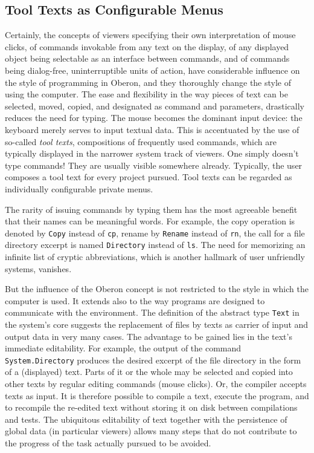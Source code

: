 \subsection{Tool Texts as Configurable Menus}
Certainly, the concepts of viewers specifying their own interpretation of mouse clicks,
of commands invokable from any text on the display, of any displayed object being selectable
as an interface between commands, and of commands being dialog-free, uninterruptible units
of action, have considerable influence on the style of programming in Oberon, and they
thoroughly change the style of using the computer. The ease and flexibility in the way
pieces of text can be selected, moved, copied, and designated as command and parameters,
drastically reduces the need for typing. The mouse becomes the dominant input device: the
keyboard merely serves to input textual data. This is accentuated by the use of so-called
\emph{tool texts}, compositions of frequently used commands, which are typically displayed
in the narrower system track of viewers. One simply doesn't type commands! They are usually
visible somewhere already. Typically, the user composes a tool text for every project pursued.
Tool texts can be regarded as individually configurable private menus.

The rarity of issuing commands by typing them has the most agreeable benefit that their names
can be meaningful words. For example, the copy operation is denoted by \verb|Copy| instead of
\verb|cp|, rename by \verb|Rename| instead of \verb|rn|, the call for a file directory excerpt
is named \verb|Directory| instead of \verb|ls|. The need for memorizing an infinite list of
cryptic abbreviations, which is another hallmark of user unfriendly systems, vanishes.

But the influence of the Oberon concept is not restricted to the style in which the computer
is used. It extends also to the way programs are designed to communicate with the environment.
The definition of the abstract type \verb|Text| in the system's core suggests the replacement
of files by texts as carrier of input and output data in very many cases. The advantage to
be gained lies in the text's immediate editability. For example, the output of the command
\verb|System.Directory| produces the desired excerpt of the file directory in the form of
a (displayed) text. Parts of it or the whole may be selected and copied into other texts
by regular editing commands (mouse clicks). Or, the compiler accepts texts as input. It is
therefore possible to compile a text, execute the program, and to recompile the re-edited
text without storing it on disk between compilations and tests. The ubiquitous editability
of text together with the persistence of global data (in particular viewers) allows many
steps that do not contribute to the progress of the task actually pursued to be avoided.

